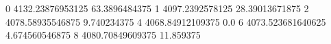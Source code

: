 0 4132.23876953125 63.3896484375
1 4097.2392578125 28.39013671875
2 4078.58935546875 9.740234375
4 4068.84912109375 0.0
6 4073.523681640625 4.674560546875
8 4080.70849609375 11.859375

